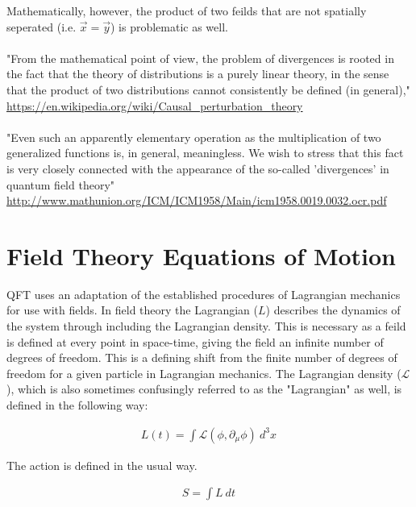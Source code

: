 \documentclass[aps,secnumarabic,nobalancelastpage,amsmath,amssymb,
nofootinbib]{revtex4}
\newcommand{\Lagr}{\mathcal{L}}
\begin{document}
\noindent Mathematically, however, the product of two feilds that are not spatially seperated (i.e. $\vec{x}=\vec{y}$) is problematic as well. 
\\\\
"From the mathematical point of view, the problem of divergences is rooted in the fact that the theory of distributions is a purely linear theory, in the sense that the product of two distributions cannot consistently be defined (in general),"\\
\url{https://en.wikipedia.org/wiki/Causal_perturbation_theory}
\\\\
"Even such an apparently elementary operation as the multiplication of two generalized functions is, in general, meaningless. We wish to stress that this fact is very closely connected with the appearance of the so-called 'divergences' in quantum field theory"\\
\url{http://www.mathunion.org/ICM/ICM1958/Main/icm1958.0019.0032.ocr.pdf}


\section{Field Theory Equations of Motion}
QFT uses an adaptation of the established procedures of Lagrangian mechanics for use with fields. In field theory the Lagrangian ($L$) describes the dynamics of the system through including the Lagrangian density. This is necessary as a feild is defined at every point in space-time, giving the field an infinite number of degrees of freedom. This is a defining shift from the finite number of degrees of freedom for a given particle in Lagrangian mechanics. The Lagrangian density ($\Lagr$), which is also sometimes confusingly referred to as the "Lagrangian" as well, is defined in the following way:

\begin{equation}
\begin{split}
L(t)= \int \Lagr(\phi,\partial_{\mu}\phi) \ d^3 x
\, \label{eq:first-equation}
\end{split}
\end{equation}

\noindent The action is defined in the usual way.

\begin{equation}
\begin{split}
S = \int L \ dt 
\, \label{eq:second-equation}
\end{split}
\end{equation}
\end{document}
